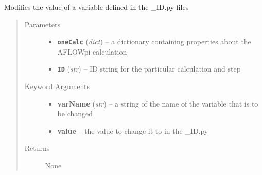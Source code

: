 \documentclass[letterpaper,10pt,english]{sphinxmanual}
\begin{document}
\begin{fulllineitems}
\label{prep:prep.__modifyVarVal}
Modifies the value of a variable defined in the \_ID.py files
\begin{quote}\begin{description}
\item[{Parameters}] \leavevmode\begin{itemize}
\item {} 
\textbf{\texttt{oneCalc}} (\emph{dict}) -- a dictionary containing properties about the AFLOWpi calculation

\item {} 
\textbf{\texttt{ID}} (\emph{str}) -- ID string for the particular calculation and step

\end{itemize}

\item[{Keyword Arguments}] \leavevmode\begin{itemize}
\item {} 
\textbf{varName} (\emph{str}) --
a string of the name of the variable that is to be changed

\item {} 
\textbf{value} --
the value to change it to in the \_ID.py

\end{itemize}

\item[{Returns}] \leavevmode
None

\end{description}\end{quote}

\end{fulllineitems}


\begin{fulllineitems}
\label{prep:prep.__null__}
\end{fulllineitems}

\end{document}
